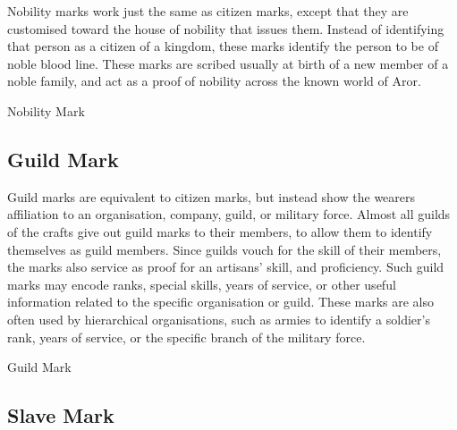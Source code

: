 Nobility marks work just the same as citizen marks, except that they are
customised toward the house of nobility that issues them. Instead of
identifying that person as a citizen of a kingdom, these marks identify the
person to be of noble blood line. These marks are scribed usually at birth of
a new member of a noble family, and act as a proof of nobility across the
known world of Aror.

\begin{35e}{Nobility Mark}
\end{35e}

\subsection{Guild Mark}
\label{sec:Guild Mark}

Guild marks are equivalent to citizen marks, but instead show the wearers
affiliation to an organisation, company, guild, or military force. Almost all
guilds of the crafts give out guild marks to their members, to allow them to
identify themselves as guild members. Since guilds vouch for the skill of
their members, the marks also service as proof for an artisans' skill, and
proficiency. Such guild marks may encode ranks, special skills, years of
service, or other useful information related to the specific organisation or
guild. These marks are also often used by hierarchical organisations, such as
armies to identify a soldier's rank, years of service, or the specific branch
of the military force.

\begin{35e}{Guild Mark}
\end{35e}

\subsection{Slave Mark}
\label{sec:Slave Mark}

